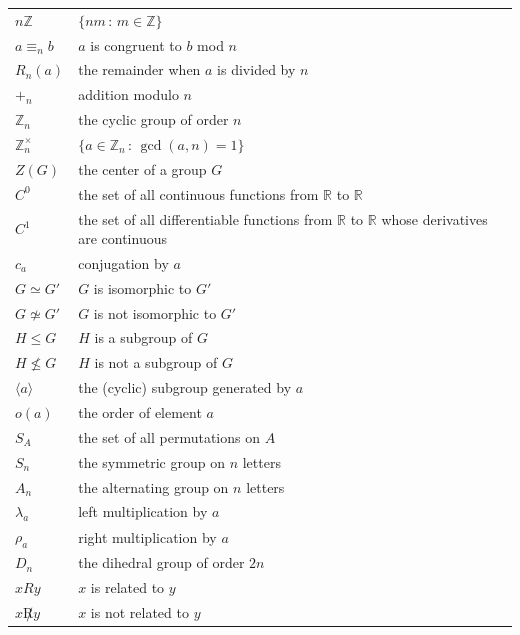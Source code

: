 \documentclass[10pt,]{book}
\theoremstyle{plain}
\theoremstyle{definition}
\theoremstyle{definition}
\theoremstyle{definition}
\theoremstyle{definition}
\numberwithin{equation}{section}
\def\Z{\mathbb{Z}}
\def\R{\mathbb{R}}
\begin{document}
\begin{longtable}[l]{lp{}r}
$n\Z$&\(\{nm\,:\,m\in \Z\}\)&\pageref{notation-39}\\
$a\equiv_n b$&\(a\) is congruent to \(b\) mod \(n\)&\pageref{notation-40}\\
$R_n(a)$&the remainder when \(a\) is divided by \(n\)&\pageref{notation-41}\\
$+_n$&addition modulo \(n\)&\pageref{notation-42}\\
$\Z_n$&the cyclic group of order \(n\)&\pageref{notation-43}\\
$\Z_n^{\times}$&\(\{a\in \Z_n\,:\,\gcd(a,n)=1\}\)&\pageref{notation-44}\\
$Z(G)$&the center of a group \(G\)&\pageref{notation-45}\\
$C^0$&the set of all continuous functions from
        \(\R\) to \(\R\)&\pageref{notation-46}\\
$C^1$&the set of all differentiable functions from
        \(\R\) to \(\R\) whose derivatives are continuous&\pageref{notation-47}\\
$c_a$&conjugation by \(a\)&\pageref{notation-48}\\
$G\simeq G'$&\(G\) is isomorphic to \(G'\)&\pageref{notation-49}\\
$G\not \simeq G'$&\(G\) is not isomorphic to \(G'\)&\pageref{notation-50}\\
$H\leq G$&\(H\) is a subgroup of \(G\)&\pageref{notation-51}\\
$H\not \leq G$&\(H\) is not a subgroup of \(G\)&\pageref{notation-52}\\
$\langle a \rangle $&the (cyclic) subgroup generated by \(a\)&\pageref{notation-53}\\
$o(a)$&the order of element \(a\)&\pageref{notation-54}\\
$S_A$&the set of all permutations on \(A\)&\pageref{notation-55}\\
$S_n$&the symmetric group on \(n\) letters&\pageref{notation-56}\\
$A_n$&the alternating group on \(n\) letters&\pageref{notation-57}\\
$\lambda_a$&left multiplication by \(a\)&\pageref{notation-58}\\
$\rho_a$&right multiplication by \(a\)&\pageref{notation-59}\\
$D_n$&the dihedral group of order \(2n\)&\pageref{notation-60}\\
$xRy$&\(x\) is related to \(y\)&\pageref{notation-61}\\
$x\not R y$&\(x\) is not related to \(y\)&\pageref{notation-62}\\

\end{longtable}
\end{document}
